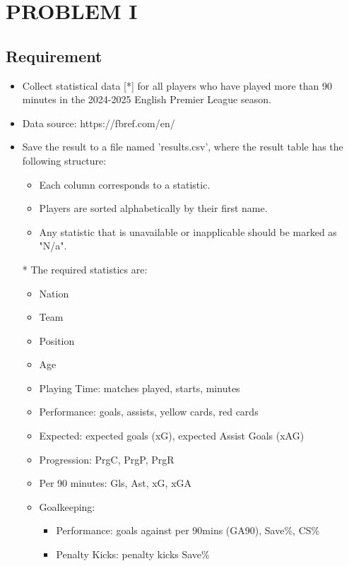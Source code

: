 \documentclass[12pt]{report}
\begin{document}
\chapter{PROBLEM I} %
{
\section{Requirement} %
\begin{itemize}
	\item Collect statistical data [*] for all players who have played more than 90 minutes in the 2024-2025 English Premier League season.
\item Data source: https://fbref.com/en/
	\item Save the result to a file named 'results.csv', where the result table has the following structure:
	\begin{itemize}
		\item Each column corresponds to a statistic.
\item Players are sorted alphabetically by their first name.
		\item Any statistic that is unavailable or inapplicable should be marked as "N/a".
\end{itemize}
\end{itemize}
\begin{itemize}
    \item[*] The required statistics are:
    \begin{itemize}
        \item Nation
        \item Team
        \item Position
        \item Age
        \item Playing Time: matches played, starts, minutes
        \item Performance: goals, assists, yellow cards, red cards
        \item Expected: expected goals (xG), expected Assist Goals (xAG)
 \item Progression: PrgC, PrgP, PrgR
        \item Per 90 minutes: Gls, Ast, xG, xGA
        \item Goalkeeping:
        \begin{itemize}
            \item Performance: goals against per 90mins (GA90), Save\%, CS\%
            \item Penalty Kicks: penalty kicks Save\%
        \end{itemize}

\end{itemize}
\end{itemize}}
\end{document}

